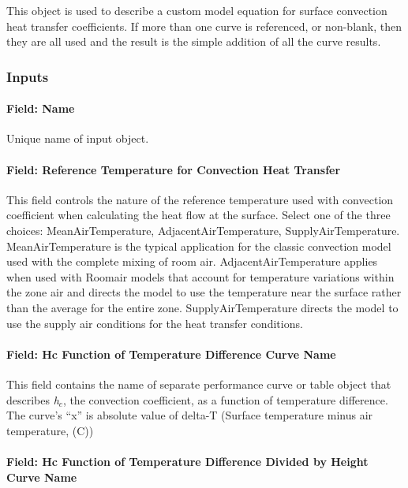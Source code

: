 This object is used to describe a custom model equation for surface convection heat transfer coefficients. If more than one curve is referenced, or non-blank, then they are all used and the result is the simple addition of all the curve results.

\subsubsection{Inputs}\label{inputs-8}

\paragraph{Field: Name}\label{field-name-7}

Unique name of input object.

\paragraph{Field: Reference Temperature for Convection Heat Transfer}\label{field-reference-temperature-for-convection-heat-transfer}

This field controls the nature of the reference temperature used with convection coefficient when calculating the heat flow at the surface. Select one of the three choices: MeanAirTemperature, AdjacentAirTemperature, SupplyAirTemperature. MeanAirTemperature is the typical application for the classic convection model used with the complete mixing of room air. AdjacentAirTemperature applies when used with Roomair models that account for temperature variations within the zone air and directs the model to use the temperature near the surface rather than the average for the entire zone. SupplyAirTemperature directs the model to use the supply air conditions for the heat transfer conditions.

\paragraph{Field: Hc Function of Temperature Difference Curve Name}\label{field-hc-function-of-temperature-difference-curve-name}

This field contains the name of separate performance curve or table object that describes \emph{h\(_{c}\)}, the convection coefficient, as a function of temperature difference. The curve's ``x'' is absolute value of delta-T (Surface temperature minus air temperature, (C))

\paragraph{Field: Hc Function of Temperature Difference Divided by Height Curve Name}\label{field-hc-function-of-temperature-difference-divided-by-height-curve-name}

